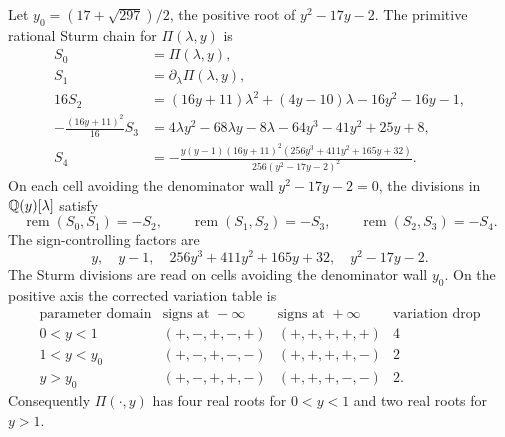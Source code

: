 \begin{lemma}\label{lem:positive-axis-sturm-count}
Let $y_0=(17+\sqrt{297})/2$, the positive root of $y^2-17y-2$.  The primitive rational Sturm chain for \(\Pi(\lambda,y)\) is
\begin{align*}
S_0&=\Pi(\lambda,y),\\
S_1&=\partial_\lambda\Pi(\lambda,y),\\
16S_2&=(16y+11)\lambda^2+(4y-10)\lambda-16y^2-16y-1,\\
-\frac{(16y+11)^2}{16}S_3
&=4\lambda y^2-68\lambda y-8\lambda-64y^3-41y^2+25y+8,\\
S_4&=-\frac{y(y-1)(16y+11)^2(256y^3+411y^2+165y+32)}{256(y^2-17y-2)^2}.
\end{align*}
On each cell avoiding the denominator wall \(y^2-17y-2=0\), the divisions in \(\mathbb{Q}(y)[\lambda]\) satisfy
\[
\operatorname{rem}(S_0,S_1)=-S_2,
\qquad
\operatorname{rem}(S_1,S_2)=-S_3,
\qquad
\operatorname{rem}(S_2,S_3)=-S_4.
\]
The sign-controlling factors are
\begin{equation}\label{eq:positive-axis-sturm-sign-factors}
y,\quad y-1,\quad 256y^3+411y^2+165y+32,
\quad y^2-17y-2.
\end{equation}
The Sturm divisions are read on cells avoiding the denominator wall \(y_0\).  On the positive axis the corrected variation table is
\begin{equation}\label{eq:positive-axis-sturm-sign-table-main}
\begin{array}{c|c|c|c}
\text{parameter domain} & \text{signs at }-\infty & \text{signs at }+\infty & \text{variation drop}\\
\hline
0<y<1 & (+,-,+,-,+) & (+,+,+,+,+) & 4\\
1<y<y_0 & (+,-,+,-,-) & (+,+,+,+,-) & 2\\
y>y_0 & (+,-,+,+,-) & (+,+,+,-,-) & 2.
\end{array}
\end{equation}
Consequently \(\Pi(\cdot,y)\) has four real roots for \(0<y<1\) and two real roots for \(y>1\).
\end{lemma}

